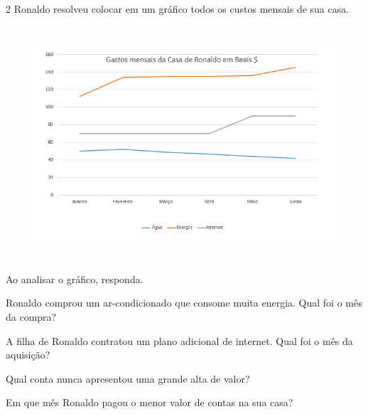 \\
\\
\\
\\
\\

\num{2} Ronaldo resolveu colocar em um gráfico todos os custos mensais de sua casa.

\begin{figure}[H]
\centering\includegraphics[width=5.30833in,height=3.41384in]{./imgSAEB_8_MAT/media/image40.png}
\end{figure}

Ao analisar o gráfico, responda.

\begin{escolha}[itemsep=0pt]
\item Ronaldo comprou um ar-condicionado que consome muita energia. Qual foi o mês da compra?
\item A filha de Ronaldo contratou um plano adicional de internet. Qual foi o mês da aquisição?
\item Qual conta nunca apresentou uma grande alta de valor?
\item Em que mês Ronaldo pagou o menor valor de contas na sua casa?
\end{escolha}

\\
\\
\\
\\

